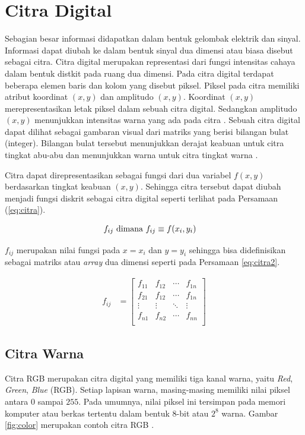 \section{Citra Digital}
Sebagian besar informasi didapatkan dalam bentuk gelombak elektrik dan sinyal. Informasi dapat diubah ke dalam bentuk sinyal dua dimensi atau biasa disebut sebagai citra. Citra digital merupakan representasi dari fungsi intensitas cahaya dalam bentuk distkit pada ruang dua dimensi. Pada citra digital terdapat beberapa elemen baris dan kolom yang disebut piksel. Piksel pada citra memiliki atribut koordinat $(x,y)$ dan amplitudo $(x,y)$. Koordinat $(x,y)$ merepresentasikan letak piksel dalam sebuah citra digital. Sedangkan amplitudo $(x,y)$ menunjukkan intensitas warna yang ada pada citra \citep{Ratna2020}. Sebuah citra digital dapat dilihat sebagai gambaran visual dari matriks yang berisi bilangan bulat (integer). Bilangan bulat tersebut menunjukkan derajat keabuan untuk citra tingkat abu-abu dan menunjukkan warna untuk citra tingkat warna \citep{Blackledge2005,Septiaji2018}.

Citra dapat direpresentasikan sebagai fungsi dari dua variabel $f(x,y)$ berdasarkan tingkat keabuan $(x,y)$. Sehingga citra tersebut dapat diubah menjadi fungsi diskrit sebagai citra digital seperti terlihat pada Persamaan (\ref{eq:citra}).

\begin{align}
    f_{ij} \textnormal{ dimana } f_{ij} &\equiv f(x_i, y_i)
    \label{eq:citra}
\end{align}

$f_{ij}$ merupakan nilai fungsi pada $x=x_i$ dan $y=y_i$ sehingga bisa didefinisikan sebagai matriks atau \textit{array} dua dimensi seperti pada Persamaan \ref{eq:citra2}.

\begin{align}
    f_{ij} &=
    \begin{bmatrix}
        f_{11} &f_{12} &\cdots &f_{1n}\\
        f_{21} &f_{12} &\cdots &f_{1n}\\
        \vdots &\vdots &\ddots &\vdots\\
        f_{n1} &f_{n2} &\cdots &f_{nn}\\
    \end{bmatrix}
    \label{eq:citra2}
\end{align}

    \subsection{Citra Warna}
    Citra RGB merupakan citra digital yang memiliki tiga kanal warna, yaitu \textit{Red}, \textit{Green}, \textit{Blue} (RGB). Setiap lapisan warna, masing-masing memiliki nilai piksel antara $0$ sampai $255$. Pada umumnya, nilai piksel ini tersimpan pada memori komputer atau berkas tertentu dalam bentuk 8-bit atau $2^8$ warna. Gambar \ref{fig:color} merupakan contoh citra RGB \citep{Septiaji2018}.

